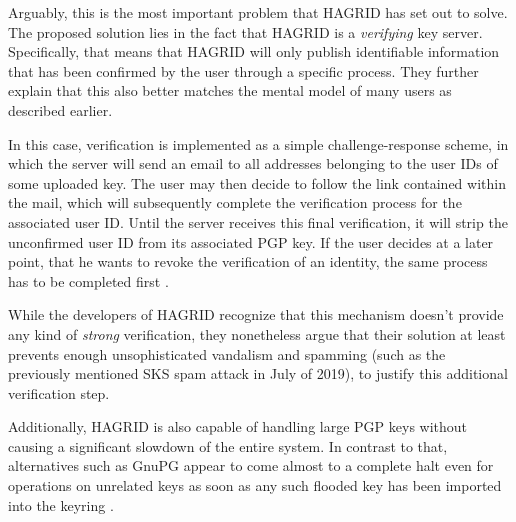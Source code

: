 Arguably, this is the most important problem that HAGRID has set out to solve. The proposed solution lies in the fact that HAGRID is a \emph{verifying} key server. Specifically, that means that HAGRID will only publish identifiable information that has been confirmed by the user through a specific process. They further explain that this also better matches the mental model of many users as described earlier.

In this case, verification is implemented as a simple challenge-response scheme, in which the server will send an email to all addresses belonging to the user IDs of some uploaded key. The user may then decide to follow the link contained within the mail, which will subsequently complete the verification process for the associated user ID.
Until the server receives this final verification, it will strip the unconfirmed user ID from its associated PGP key. If the user decides at a later point, that he wants to revoke the verification of an identity, the same process has to be completed first \cite{sequoia_blog}.

While the developers of HAGRID recognize that this mechanism doesn't provide any kind of \emph{strong} verification, they nonetheless argue that their solution at least prevents enough unsophisticated vandalism and spamming (such as the previously mentioned SKS spam attack in July of 2019), to justify this additional verification step.

Additionally, HAGRID is also capable of handling large PGP keys without causing a significant slowdown of the entire system. In contrast to that, alternatives such as GnuPG appear to come almost to a complete halt even for operations on unrelated keys as soon as any such flooded key has been imported into the keyring \cite{flooding_blog}. 

